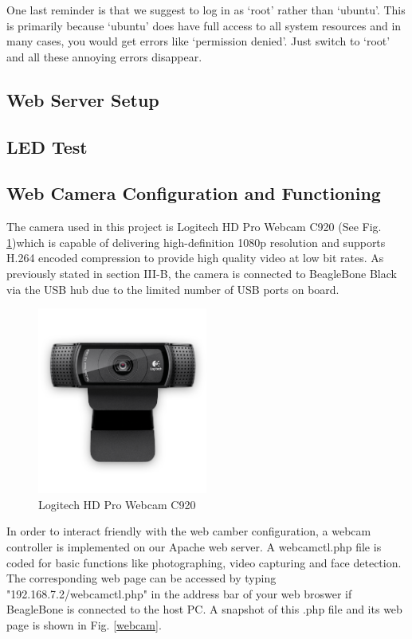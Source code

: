 \documentclass[12pt,journal,draftclsnofoot,onecolumn]{IEEEtran}
\begin{document}
One last reminder is that we suggest to log in as `root' rather than `ubuntu'. This is primarily because `ubuntu' does have full access to all system resources and in many cases, you would get errors like `permission denied'. Just switch to `root' and all these annoying errors disappear.

\subsection{Web Server Setup}\label{Webser}
	
\subsection{LED Test}\label{Led}
	
\subsection{Web Camera Configuration and Functioning}\label{Webcam}
The camera used in this project is Logitech HD Pro Webcam C920 \cite{logicam} (See Fig. \ref{logicam})which is  capable of delivering high-definition 1080p resolution and supports H.264 encoded compression to provide high quality video at low bit rates. As previously stated in section III-B, the camera is connected to BeagleBone Black via the USB hub due to the limited number of USB ports on board.
\begin{figure}[htb]
	\centering
	\includegraphics[width=2.2in]{./figs/webcam4.PNG}
	\caption{Logitech HD Pro Webcam C920}
	\label{logicam}
\end{figure}

In order to interact friendly with the web camber configuration, a webcam controller is implemented on our Apache web server. A webcamctl.php file is coded for basic functions like photographing, video capturing and face detection. The corresponding web page can be accessed by typing "192.168.7.2/webcamctl.php" in the address bar of your web broswer if BeagleBone is connected to the host PC.  A snapshot of this .php file and its web page is shown in Fig. \ref{webcam}.
\end{document}
